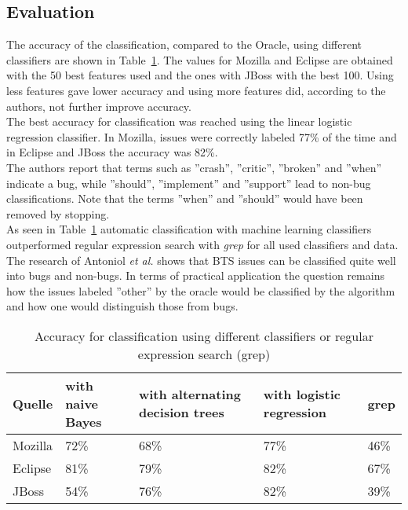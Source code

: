 \subsection{Evaluation}
The accuracy of the classification, compared to the Oracle, using different classifiers are shown in \mbox{Table \ref{tab:Antoniol}}. The values for Mozilla and Eclipse are obtained with the 50 best features used and the ones with JBoss with the best 100. Using less features gave lower accuracy and using more features did, according to the authors, not further improve accuracy.\\
The best accuracy for classification was reached using  the linear logistic regression classifier. In Mozilla, issues were correctly labeled 77\% of the time and in Eclipse and JBoss the accuracy was 82\%.
\\
The authors report that terms such as ''crash'', ''critic'', ''broken'' and ''when'' indicate a bug, while ''should'', ''implement'' and ''support'' lead to non-bug classifications. Note that the terms ''when'' and ''should'' would have been removed by stopping.
\\ 
As seen in \mbox{Table \ref{tab:Antoniol}} automatic classification with machine learning classifiers outperformed regular expression search with \textit{grep} for all used classifiers and data.
\\
The research of Antoniol \textit{et al.} shows that BTS issues can be classified quite well into bugs and non-bugs. In terms of practical application the question remains how the issues labeled ''other'' by the oracle would be classified by the algorithm and how one would distinguish those from bugs.
\begin{table} [h] 
\centering
\setlength{\tabcolsep}{1em}
\renewcommand{\arraystretch}{1.5}
\caption{Accuracy for classification using different classifiers or regular expression search (grep)}
\label{tab:Antoniol}
\begin{tabular}{p{1cm}|p{2cm}|p{3cm}|p{4cm}|p{0.8cm}}
\hline
 \textbf{Quelle} & \textbf{with naive Bayes}& \textbf{with alternating decision trees}&\textbf{with logistic regression} &  \textbf{grep}\\
\hline
 \hline
Mozilla & 72\% & 68\% & 77\% & 46\% \\
 \hline
Eclipse & 81\% & 79\% & 82\% & 67\% \\
 \hline
JBoss & 54\% & 76\% & 82\% & 39\%\\
 \hline
\end{tabular}
\end{table}

